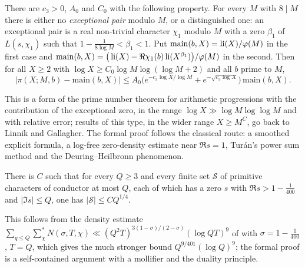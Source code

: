 \begin{littheorem}
\label{pf:top-supply:pnt}
There are $c_3>0$, $A_0$ and $C_0$ with the following property. For every $M$ with $8\mid M$ there is either no
\emph{exceptional pair} modulo $M$, or a distinguished one: an exceptional pair is a real non-trivial character $\chi_1$
modulo $M$ with a zero $\beta_1$ of $L(s,\chi_1)$ such that $1-\frac1{8\log M}<\beta_1<1$. Put
$\mathrm{main}(b,X)=\operatorname{li}(X)/\varphi(M)$ in the first case and
$\mathrm{main}(b,X)=\big(\operatorname{li}(X)-\Re\chi_1(b)\operatorname{li}(X^{\beta_1})\big)/\varphi(M)$ in the second. Then for
all $X\ge2$ with $\log X\ge C_0\log M\log(\log M+2)$ and all $b$ prime to $M$,
\[
\big|\pi(X;M,b)-\mathrm{main}(b,X)\big|\le A_0\Big(e^{-c_3\log X/\log M}+e^{-\sqrt{c_3\log X}}\Big)\,\mathrm{main}(b,X).
\]
\end{littheorem}

This is a form of the prime number theorem for arithmetic progressions with the contribution of the exceptional
zero, in the range $\log X\gg\log M\log\log M$ and with relative error; results of this type, in the wider range
$X\ge M^{C}$, go back to Linnik and Gallagher. The formal proof follows the classical route: a smoothed explicit
formula, a log-free zero-density estimate near $\Re s=1$, Tur\'an's power sum method and the Deuring--Heilbronn
phenomenon.

\begin{littheorem}[Zero density near $\Re s=1$ {\cite[Ch.~12]{Montgomery1971}}]\label{pf:top-supply:density}
There is $C$ such that for every $Q\ge3$ and every finite set $\mathcal S$ of primitive characters of conductor at
most $Q$, each of which has a zero $s$ with $\Re s>1-\frac1{400}$ and $|\Im s|\le Q$, one has
$|\mathcal S|\le CQ^{1/4}$.
\end{littheorem}

This follows from the density estimate $\sum_{q\le Q}\sum^*_{\chi}N(\sigma,T,\chi)\ll(Q^2T)^{3(1-\sigma)/(2-\sigma)}
(\log QT)^9$ of \cite[Ch.~12]{Montgomery1971} with $\sigma=1-\frac1{400}$, $T=Q$, which gives the much stronger bound
$Q^{9/401}(\log Q)^9$; the formal proof is a self-contained argument with a mollifier and the duality principle.

